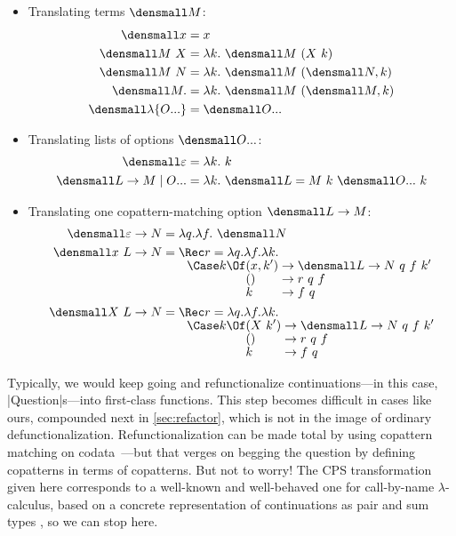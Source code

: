 \documentclass[sigplan,screen]{acmart}
\begin{document}
\begin{itemize}
\item  Translating terms $\den{M}$:
\begin{align*}
  \den{x} &= x
  \\
  \den{M~X} &= \lambda k.~ \den{M} ~ (X ~ k)
  \\
  \den{M~N} &= \lambda k.~ \den{M} ~ (\den{N}, k)
  \\
  \den{M.} &= \lambda k.~ \den{M} ~ (\den{M}, k)
  \\
  \den{\lambda\{\many{O}\}} &= \den{\many{O}}
\end{align*}
\item  Translating lists of options $\den{\many{O}}$:
\begin{align*}
  \den{\varepsilon} &= \lambda k.~ k
  \\
  \den{L \to M \mid \many{O}}
  &=
  \lambda k.~ \den{L = M} ~ k ~ \den{\many{O}} ~ k
\end{align*}
\item Translating one copattern-matching option $\den{L \to M}$:
\begin{align*}
  \den{\varepsilon \to N} &= \lambda q. \lambda f.~ \den{N}
  \\
  \den{x ~ L \to N} &= \Rec r = \lambda q. \lambda f. \lambda k.
  \\[-1ex]
  &\qquad
  \Case k \Of
  \begin{alignedat}[t]{2}
    &(x, k') &&\to \den{L \to N} ~ q ~ f ~ k'
    \\[-1ex]
    &() &&\to r ~ q ~ f
    \\[-1ex]
    &k &&\to f ~ q
  \end{alignedat}
  \\
  \den{X ~ L \to N} &= \Rec r = \lambda q. \lambda f. \lambda k.
  \\[-1ex]
  &\qquad
  \Case k \Of
  \begin{alignedat}[t]{2}
    &(X ~ k') &&\to \den{L \to N} ~ q ~ f ~ k'
    \\[-1ex]
    &() &&\to r ~ q ~ f
    \\[-1ex]
    &k &&\to f ~ q
  \end{alignedat}
\end{align*}
\end{itemize}

\begin{remark}
  Typically, we would keep going and refunctionalize continuations---in this
  case, \hs|Question|s---into first-class functions.  This step becomes
  difficult in cases like ours, compounded next in \cref{sec:refactor}, which is
  not in the image of ordinary defunctionalization.  Refunctionalization can be
  made total by using copattern matching on
  codata~\cite{RefunctionalizationCopatterns}---but that verges on begging the
  question by defining copatterns in terms of copatterns.  But not to worry!
  The CPS transformation given here corresponds to a well-known and well-behaved
  one for call-by-name $\lambda$-calculus, based on a concrete representation of
  continuations as pair and sum types
  \cite{ContinuationModels,ClassicalLogicContinuationSemantics,CBNSyntacticCPS,AnswerTypePolyEta},
  so we can stop here.
\end{remark}
\end{document}
